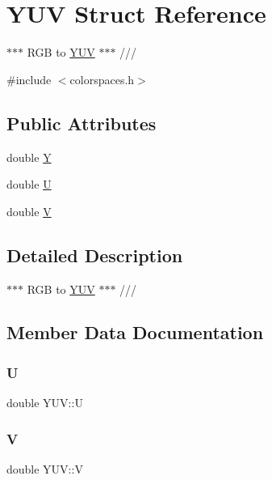 \hypertarget{struct_y_u_v}{}\section{Y\+UV Struct Reference}
\label{struct_y_u_v}


$\ast$$\ast$$\ast$ R\+GB to \hyperlink{struct_y_u_v}{Y\+UV} $\ast$$\ast$$\ast$ ///  




{\ttfamily \#include $<$colorspaces.\+h$>$}

\subsection*{Public Attributes}
\begin{DoxyCompactItemize}
\item 
double \hyperlink{struct_y_u_v_a4d1d3671a68d8b66418f0eb4a73d8a8a}{Y}
\item 
double \hyperlink{struct_y_u_v_abaedc9ade54a0c762f07c0f9cf034643}{U}
\item 
double \hyperlink{struct_y_u_v_a423a8053664584441466d69f809fde43}{V}
\end{DoxyCompactItemize}


\subsection{Detailed Description}
$\ast$$\ast$$\ast$ R\+GB to \hyperlink{struct_y_u_v}{Y\+UV} $\ast$$\ast$$\ast$ /// 

\subsection{Member Data Documentation}
\mbox{\label{struct_y_u_v_abaedc9ade54a0c762f07c0f9cf034643}} 
\subsubsection{\texorpdfstring{U}{U}}
{\footnotesize\ttfamily double Y\+U\+V\+::U}

\mbox{\label{struct_y_u_v_a423a8053664584441466d69f809fde43}} 
\subsubsection{\texorpdfstring{V}{V}}
{\footnotesize\ttfamily double Y\+U\+V\+::V}

